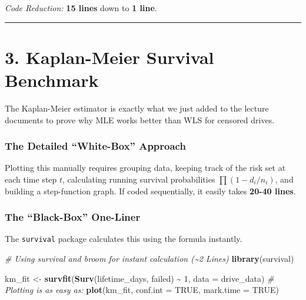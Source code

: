 \documentclass[
]{article}
\newenvironment{Shaded}{\begin{snugshade}}{\end{snugshade}}
\newcommand{\AttributeTok}[1]{\textcolor[rgb]{0.13,0.29,0.53}{#1}}
\newcommand{\CommentTok}[1]{\textcolor[rgb]{0.56,0.35,0.01}{\textit{#1}}}
\newcommand{\ConstantTok}[1]{\textcolor[rgb]{0.56,0.35,0.01}{#1}}
\newcommand{\DecValTok}[1]{\textcolor[rgb]{0.00,0.00,0.81}{#1}}
\newcommand{\FunctionTok}[1]{\textcolor[rgb]{0.13,0.29,0.53}{\textbf{#1}}}
\newcommand{\NormalTok}[1]{#1}
\newcommand{\OtherTok}[1]{\textcolor[rgb]{0.56,0.35,0.01}{#1}}
\newcommand{\SpecialCharTok}[1]{\textcolor[rgb]{0.81,0.36,0.00}{\textbf{#1}}}
\begin{document}
\emph{Code Reduction:} \textbf{15 lines} down to \textbf{1 line}.

\begin{center}\rule{0.5\linewidth}{0.5pt}\end{center}

\section{3. Kaplan-Meier Survival
Benchmark}\label{kaplan-meier-survival-benchmark}

The Kaplan-Meier estimator is exactly what we just added to the lecture
documents to prove why MLE works better than WLS for censored drives.

\subsubsection{The Detailed ``White-Box''
Approach}\label{the-detailed-white-box-approach-2}

Plotting this manually requires grouping data, keeping track of the risk
set at each time step \(t\), calculating running survival probabilities
\(\prod (1 - d_i/n_i)\), and building a step-function graph. If coded
sequentially, it easily takes \textbf{20-40 lines}.

\subsubsection{The ``Black-Box''
One-Liner}\label{the-black-box-one-liner-2}

The \texttt{survival} package calculates this using the formula
instantly.

\begin{Shaded}
\begin{Highlighting}[]
\CommentTok{\# Using survival and broom for instant calculation (\textasciitilde{}2 Lines)}
\FunctionTok{library}\NormalTok{(survival)}

\NormalTok{km\_fit }\OtherTok{\textless{}{-}} \FunctionTok{survfit}\NormalTok{(}\FunctionTok{Surv}\NormalTok{(lifetime\_days, failed) }\SpecialCharTok{\textasciitilde{}} \DecValTok{1}\NormalTok{, }\AttributeTok{data =}\NormalTok{ drive\_data)}
\CommentTok{\# Plotting is as easy as:}
\FunctionTok{plot}\NormalTok{(km\_fit, }\AttributeTok{conf.int =} \ConstantTok{TRUE}\NormalTok{, }\AttributeTok{mark.time =} \ConstantTok{TRUE}\NormalTok{)}
\end{Highlighting}
\end{Shaded}
\end{document}
